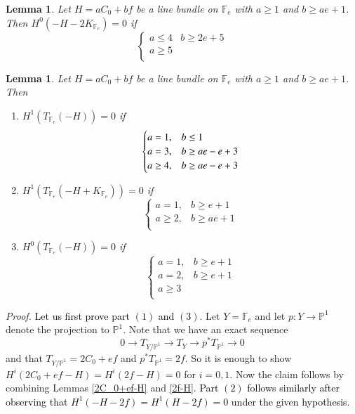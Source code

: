 \documentclass[11pt,twoside]{amsart}
\theoremstyle{plain}
\numberwithin{equation}{section}
\newtheorem{lemma}[theorem]{Lemma}
\theoremstyle{definition}
\begin{document}
\begin{lemma}\label{-H-2K_Y}
Let $H = aC_0+bf$ be a line bundle on $\mathbb{F}_e$ with $a \geq 1$ and $b \geq ae+1$. Then $H^0(-H-2K_{\mathbb{F}_e}) = 0$ if 
\[
\begin{cases}
   a \leq 4 & b \geq 2e+5  \\
   a \geq 5 &   \\
   
\end{cases}
\]
    
\end{lemma}

\begin{lemma}\label{T_Y(-H)}
Let $H = aC_0+bf$ be a line bundle on $\mathbb{F}_e$ with $a \geq 1$ and $b \geq ae+1$. Then 
\begin{enumerate}
    \item[(1)] $H^1(T_{\mathbb{F}_e}(-H)) = 0$ if 
\[
\begin{cases}
   a = 1, & b \leq 1  \\
   a = 3, & b \geq ae-e+3 \\
   a \geq 4, &  \textcolor{black}{b \geq ae-e+3}
   
\end{cases}
\]

  \item[(2)] $H^1(T_{\mathbb{F}_e}(-H+K_{\mathbb{F}_e})) = 0$ if 
\[
\begin{cases}
   a = 1, & b \geq e+1  \\
   a \geq 2, & b \geq ae+1 \\
\end{cases}
\] 

\item[(3)] $H^0(T_{\mathbb{F}_e}(-H)) = 0$ if 
\[
\begin{cases}
   a = 1, & b \geq e+1  \\
   a = 2, & b \geq e+1 \\
   a \geq 3 & \\
\end{cases}
\] 

\end{enumerate}

\end{lemma}

\noindent\textit{Proof.} \textcolor{black}{Let us first prove part $(1)$ and $(3)$}. Let $Y = \mathbb{F}_e$ and let $p: Y \to \mathbb{P}^1$ denote the projection to $\mathbb{P}^1$. Note that we have an exact sequence 
$$0 \to T_{Y/\mathbb{P}^1} \to T_Y \to p^*T_{\mathbb{P}^1} \to 0$$
and that $T_{Y/\mathbb{P}^1} = 2C_0+ef$ and $p^*T_{\mathbb{P}^1} = 2f$. So it is enough to show $H^i(2C_0+ef-H) = H^i(2f-H) = 0$ for $i = 0,1$. Now the claim follows by combining Lemmas \ref{2C_0+ef-H} and \ref{2f-H}.
\textcolor{black}{Part $(2)$ follows similarly after observing that $H^1(-H-2f) = H^1(H-2f) = 0$ under the given hypothesis. }
\end{document}
